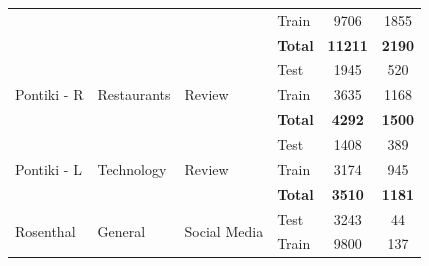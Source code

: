 \documentclass[12pt, a4paper]{report}
\theoremstyle{definition}
\theoremstyle{definition}%
\theoremstyle{definition}%
\theoremstyle{definition}%
\theoremstyle{definition}%
\theoremstyle{definition}%
\begin{document}
\begin{table}
\begin{tabular}{|l|l|l|l|c|c|}
		                                       &                                      &                                    & Train                               & 9706                               & 1855                               \\ \cline{4-6}
		                                       &                                      &                                    & \textbf{Total}                      & \textbf{11211}                     & \textbf{2190}                      \\ \hline\hline
		\multirow{3}{*}{Pontiki - R}           & \multirow{3}{*}{Restaurants}         & \multirow{3}{*}{Review}            & Test                                & 1945                               & 520                                \\
		                                       &                                      &                                    & Train                               & 3635                               & 1168                               \\ \cline{4-6}
		                                       &                                      &                                    & \textbf{Total}                      & \textbf{4292}                      & \textbf{1500}                      \\ \hline\hline
		\multirow{3}{*}{Pontiki - L}           & \multirow{3}{*}{Technology}          & \multirow{3}{*}{Review}            & Test                                & 1408                               & 389                                \\
		                                       &                                      &                                    & Train                               & 3174                               & 945                                \\ \cline{4-6}
		                                       &                                      &                                    & \textbf{Total}                      & \textbf{3510}                      & \textbf{1181}                      \\ \hline\hline
		\multirow{3}{*}{Rosenthal}             & \multirow{3}{*}{General}             & \multirow{3}{*}{Social Media}      & Test                                & 3243                               & 44                                 \\
		                                       &                                      &                                    & Train                               & 9800                               & 137                                \\ \cline{4-6}

\end{tabular}
\end{table}
\end{document}
